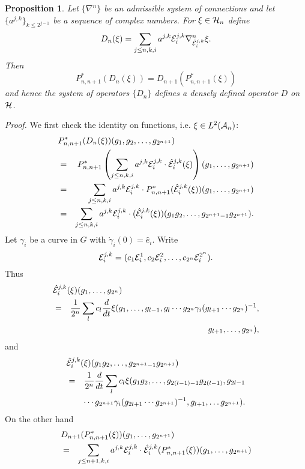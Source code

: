 \documentclass[12pt]{article}
\def\ca{{\cal A}}
\def\ce{{\cal E}}
\def\ch{{\cal H}}
\newtheorem{proposition}[thm]{Proposition}
\begin{document}
{\begin{proposition}\label{compat}
Let $\{ \nabla^n\}$ be an admissible system of connections and let $\{ a^{j,k}\}_{k\leq 2^{j-1}}$ be a sequence of complex numbers. For $\xi\in \ch_n$ define
$$D_n(\xi)=\sum_{j\leq n,k,i}a^{j,k}\ce_i^{j,k}\nabla^n_{\hat{\ce}_i^{j,k}}\xi.$$
Then 
$$P^*_{n,n+1}(D_n(\xi))=D_{n+1}(P^*_{n,n+1}(\xi))$$
and hence the system of operators $\{ D_n\}$ defines a densely defined operator $D$ on $\ch$.
\end{proposition}

\textit{Proof.} We first check the identity on functions, i.e. $\xi\in L^2(\ca_{n})$:
\begin{eqnarray*}
\lefteqn{P^*_{n,n+1}(D_n(\xi )) (g_1,g_2,\ldots ,g_{2^{n+1}})}\\
&=&P^*_{n,n+1}\left( \sum_{j\leq n,k,i}a^{j,k}\ce_i^{j,k}\cdot \hat{\ce}_i^{j,k}(\xi)\right) (g_1,\ldots ,g_{2^{n+1}})\\
&=&\sum_{j\leq n,k,i}a^{j,k}\ce_i^{j,k}\cdot P^*_{n,n+1}(\hat{\ce}_i^{j,k}(\xi) )(g_1,\ldots ,g_{2^{n+1}})\\
&=&\sum_{j\leq n,k,i}a^{j,k}\ce_i^{j,k}\cdot (\hat{\ce}_i^{j,k}(\xi) )(g_1g_2,\ldots ,g_{2^{n+1}-1}g_{2^{n+1}}).
\end{eqnarray*}
Let $\gamma_i$ be a curve in $G$ with $\dot{\gamma}_i(0)=\hat{e}_i$. Write
$$\ce_i^{j,k}=(c_1\ce_i^1,c_2\ce_i^2,\ldots ,c_{2^{n}}\ce_i^{2^n}).$$
Thus
\begin{eqnarray*}\lefteqn{\hat{\ce}_i^{j,k}(\xi) (g_1,\ldots ,g_{2^n})}\\
&=&\frac{1}{2^{n}}\sum_l c_l \frac{d}{dt}\xi(g_1,\ldots, g_{l-1},g_l\cdots g_{2^n}\gamma_i (g_{l+1}\cdots g_{2^n})^{-1},\\
&&g_{l+1},\ldots ,g_{2^n}),
\end{eqnarray*}
and
\begin{eqnarray*}\lefteqn{\hat{\ce}_i^{j,k}(\xi) (g_1g_2,\ldots ,g_{2^{n+1}-1}g_{2^{n+1}})}\\
&=&\frac{1}{2^{n}}\frac{d}{dt}\sum_l c_l \xi(g_1g_2,\ldots, g_{2(l-1)-1}g_{2(l-1)},g_{2l-1}\\
&&\cdots g_{2^{n+1}}\gamma_i (g_{2l+1}\cdots  g_{2^{n+1}})^{-1},g_{l+1},\ldots g_{2^{n+1}}).
\end{eqnarray*}
On the other hand
\begin{eqnarray*}
\lefteqn{D_{n+1}(P^*_{n,n+1}(\xi))(g_1,\ldots ,g_{2^{n+1}})}\\
&=&  \sum_{j\leq n+1,k,i}a^{j,k}\ce_i^{j,k}\cdot \hat{\ce}_i^{j,k}(P^*_{n,n+1}(\xi ))(g_1,\ldots,g_{2^{n+1}})\\

\end{eqnarray*}}
\end{document}
